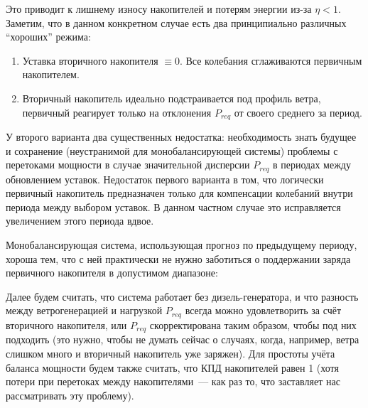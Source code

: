 Это приводит к лишнему износу накопителей и потерям энергии из-за $\eta < 1$.
Заметим, что в данном конкретном случае есть два принципиально различных ``хороших'' режима: 
\begin{enumerate}
    \item  Уставка вторичного накопителя $\equiv  0$.
    Все колебания сглаживаются первичным накопителем. 
    \item Вторичный накопитель идеально подстраивается под профиль ветра, первичный реагирует только на отклонения $P_{req}$ от своего среднего за период.
\end{enumerate}

У второго варианта два существенных недостатка: 
необходимость знать будущее и сохранение (неустранимой для монобалансирующей системы) проблемы с перетоками мощности в случае значительной дисперсии $P_{req}$ в периодах между обновлением уставок.
Недостаток первого варианта в том, что логически первичный накопитель предназначен только для компенсации колебаний внутри периода между выбором уставок.
В данном частном случае это исправляется увеличением этого периода вдвое.

Монобалансирующая система, использующая прогноз по предыдущему периоду, хороша тем, что с ней практически не нужно заботиться о поддержании заряда первичного накопителя в допустимом диапазоне:



Далее будем считать, что система работает без дизель-генератора, и что разность между ветрогенерацией и нагрузкой $P_{req}$ всегда можно удовлетворить за счёт вторичного накопителя, или  $P_{req}$ скорректирована таким образом, чтобы под них подходить (это нужно, чтобы не думать сейчас о случаях, когда, например, ветра слишком много и вторичный накопитель уже заряжен).  
Для простоты учёта баланса мощности будем также считать, что КПД накопителей равен 1 (хотя потери при перетоках между накопителями~--- как раз то, что заставляет нас рассматривать эту проблему).

